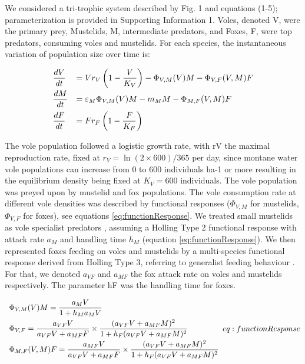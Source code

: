 \documentclass[11pt]{article}
\begin{document}
We considered a tri-trophic system described by Fig. 1 and equations (1-5); parameterization is provided in Supporting Information 1. Voles, denoted V, were the primary prey, Mustelids, M, intermediate predators, and Foxes, F, were top predators, consuming voles and mustelids. For each species, the instantaneous variation of population size over time is:

\begin{equation}
\begin{array}{l l}
\dfrac{dV}{dt} & = V r_V \left( 1- \dfrac{V}{K_V}\right) - \Phi_{V,M}(V)M - \Phi_{V,F}(V,M)F\\[.3cm]
%
\dfrac{dM}{dt} & = \varepsilon_M \Phi_{V,M}(V)M - m_M M - \Phi_{M,F}(V,M)F\\[.3cm]
%
\dfrac{dF}{dt} & = F r_F \left( 1- \dfrac{F}{K_F}\right)
\end{array}
\end{equation}

The vole population followed a logistic growth rate, with rV  the maximal reproduction rate, fixed at $r_V = \ln(2 \times 600)/365$ per day, since montane water vole populations can increase from 0  to  600 individuals ha-1 or more \citep{Giraudoux1997} resulting in the equilibrium density being fixed at $K_V = 600$ individuals. 
%
The vole population was preyed upon by mustelid and fox populations. The vole consumption rate at different vole densities was described by functional responses ($\Phi_{V,M}$ for mustelids, $\Phi_{V,F}$  for foxes), see equations \eqref{eq:functionResponse}.
%
We treated small mustelids as vole specialist predators \citep{King2006}, assuming a Holling Type 2 functional response with attack rate $a_M$ and handling time $h_M$ (equation \eqref{eq:functionResponse}). We then represented foxes feeding on voles and mustelids by a multi-species functional response derived from Holling Type 3, referring to generalist feeding behaviour \citep{Baudrot2016}. For that, we denoted $a_{VF}$ and $a_{MF}$ the fox attack rate on voles and mustelids respectively. The parameter hF was the handling time for foxes.


\begin{equation}
\begin{array}{l l}
 \Phi_{V,M}(V)M = \dfrac{a_M V}{1 + h_M a_M V} \\[.3cm]
 \Phi_{V,F} = \dfrac{a_{VF} V}{a_{VF}V + a_{MF}F} \times \dfrac{(a_{VF}V + a_{MF} M)^2}{1 + h_F(a_{VF}V + a_{MF} M)^2}\\[.3cm]
  \Phi_{M,F}(V,M)F = \dfrac{a_{MF}V}{a_{VF}V + a_{MF}F} \times \dfrac{(a_{VF}V + a_{MF}M)^2}{1+h_F(a_{VF}V + a_{MF}M)^2}
\end{array}
eq:functionResponse
\end{equation}
\end{document}
